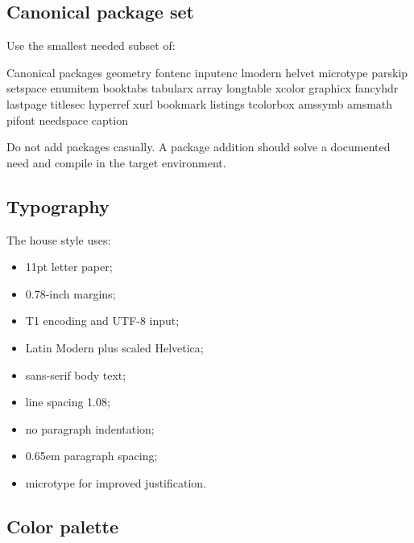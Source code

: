 \documentclass[11pt,letterpaper]{article}
\begin{document}
\subsection{Canonical package set}

Use the smallest needed subset of:

\begin{codebox}{Canonical packages}
geometry
fontenc
inputenc
lmodern
helvet
microtype
parskip
setspace
enumitem
booktabs
tabularx
array
longtable
xcolor
graphicx
fancyhdr
lastpage
titlesec
hyperref
xurl
bookmark
listings
tcolorbox
amssymb
amsmath
pifont
needspace
caption
\end{codebox}

Do not add packages casually. A package addition should solve a documented
need and compile in the target environment.

\subsection{Typography}

The house style uses:

\begin{itemize}
    \item 11pt letter paper;
    \item 0.78-inch margins;
    \item T1 encoding and UTF-8 input;
    \item Latin Modern plus scaled Helvetica;
    \item sans-serif body text;
    \item line spacing 1.08;
    \item no paragraph indentation;
    \item 0.65em paragraph spacing;
    \item microtype for improved justification.
\end{itemize}

\subsection{Color palette}
\end{document}
